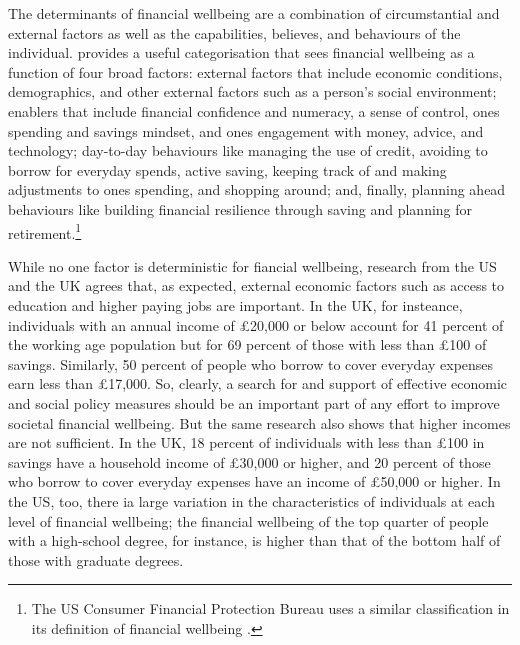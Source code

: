The determinants of financial wellbeing are a combination of circumstantial and
external factors as well as the capabilities, believes, and behaviours of the
individual. \citet{mps2018building} provides a useful categorisation that sees
financial wellbeing as a function of four broad factors: external factors that
include economic conditions, demographics, and other external factors such as a
person's social environment; enablers that include financial confidence and
numeracy, a sense of control, ones spending and savings mindset, and ones
engagement with money, advice, and technology; day-to-day behaviours like
managing the use of credit, avoiding to borrow for everyday spends, active
saving, keeping track of and making adjustments to ones spending, and shopping
around; and, finally, planning ahead behaviours like building financial
resilience through saving and planning for retirement.\footnote{The US Consumer
Financial Protection Bureau uses a similar classification in its definition of
financial wellbeing \citep{cfpb2015financial}.}

While no one factor is deterministic for fiancial wellbeing, research from the
US \citep{cfpb2017financial} and the UK \citet{mps2018building} agrees that, as
expected, external economic factors such as access to education and higher
paying jobs are important. In the UK, for insteance, individuals with an annual
income of \pounds20,000 or below account for 41 percent of the working age
population but for 69 percent of those with less than \pounds100 of savings.
Similarly, 50 percent of people who borrow to cover everyday expenses earn less
than \pounds17,000. So, clearly, a search for and support of effective economic
and social policy measures should be an important part of any effort to improve
societal financial wellbeing. But the same research also shows that higher
incomes are not sufficient. In the UK, 18 percent of individuals with less than
\pounds 100 in savings have a household income of \pounds30,000 or higher, and
20 percent of those who borrow to cover everyday expenses have an income of
\pounds50,000 or higher. In the US, too, there ia large variation in the
characteristics of individuals at each level of financial wellbeing; the
financial wellbeing of the top quarter of people with a high-school degree, for
instance, is higher than that of the bottom half of those with graduate
degrees.

